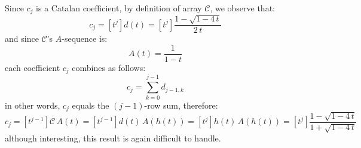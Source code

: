 \documentclass[11pt,a4paper]{article} %
\begin{document}
    Since $c_{j}$ is a Catalan coefficient, 
    by definition of array $\mathcal{C}$, we observe that:
    \begin{displaymath}
        c_{j} = [t^{j}]d(t)= [t^{j}]\frac{1-\sqrt{1-4\,t}}{2\,t}
    \end{displaymath}
    and since $\mathcal{C}$'s $A$-sequence is:
    \begin{displaymath}
        A(t)=\frac{1}{1-t}
    \end{displaymath}
    each coefficient $c_{j}$ combines as follows:
    \begin{displaymath}
        c_{j} = \sum_{k=0}^{j-1}{d_{j-1,k}}
    \end{displaymath}
    in other words, $c_{j}$ equals the $(j-1)$-row sum, therefore:
    \begin{displaymath}
        c_{j} = [t^{j-1}]\mathcal{C}\,A(t)
              = [t^{j-1}]d(t)\,A(h(t))
              = [t^{j}]h(t)\,A(h(t))
              = [t^{j}]\frac{1-\sqrt{1-4 \, t}}{1+\sqrt{1-4 \, t}}
    \end{displaymath}
    although interesting, this result is again difficult to handle.
\end{document}
